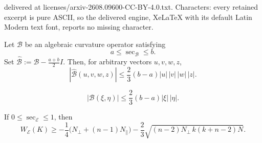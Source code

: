 \documentclass[10pt,a4paper]{amsart}
\newcommand{\cB}{\mathcal B}
\newcommand{\cE}{\mathcal E}
\begin{document}
delivered at licenses/arxiv-2608.09600-CC-BY-4.0.txt. Characters: every retained excerpt is pure ASCII, so the delivered engine, XeLaTeX with its default Latin Modern text font, reports no missing character.
\begin{lemma}\label{lem:BBK}
Let $\cB$ be an algebraic curvature operator satisfying
$$
  a\leq\sec_{\cB}\leq b.
$$
Set $\widehat{\cB}:=\cB-\frac{a+b}{2}I$.  Then, for arbitrary vectors
$u,v,w,z$,
\begin{equation}\label{eq:BBK-vectors}
  |\widehat{\cB}(u,v,w,z)|
  \leq\frac23(b-a)|u|\,|v|\,|w|\,|z|.
\end{equation}
\end{lemma}

\begin{equation}\label{eq:BK-simple-form}
  |\cB(\xi,\eta)|
  \leq\frac23(b-a)|\xi|\,|\eta|.
\end{equation}

\begin{lemma}\label{lem:tangent-twist-residual}
If $0\leq\sec_{\cE}\leq1$, then
\begin{equation*}
  W_{\cE}(K)
  \geq-\frac14\bigl(N_{\perp}+(n-1)N_{\parallel}\bigr)
  -\frac23\sqrt{(n-2)N_{\perp}\,k(k+n-2)N}.
\end{equation*}
\end{lemma}
\end{document}
